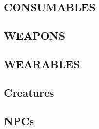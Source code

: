 \documentclass[11pt]{article} %
\begin{document}
\subsection{CONSUMABLES}
	
	
	
	\label{app:chems}
	
\newpage

\subsection{WEAPONS}
\label{app:weapons}
	
	
	
	
	
	
	
	
	
	
	
	
	
	
\newpage

\subsection{WEARABLES}
\label{app:wearables}
	
\newpage
	
	
	
	
	
	
\newpage
\addtolength{\textheight}{1.9in}
\begin{landscape}
\subsection{Creatures}
	
\end{landscape}
\subsection{NPCs}
	
\end{document}
